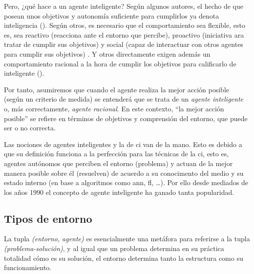 Pero, ¿qué hace a un agente inteligente? Según algunos autores, el hecho de que posean unos objetivos y autonomía suficiente para cumplirlos ya denota inteligencia (). Según otros, es necesario que el comportamiento sea flexible, esto es, sea reactivo (reacciona ante el entorno que percibe), proactivo (iniciativa ara tratar de cumplir sus objetivos) y social (capaz de interactuar con otros agentes para cumplir sus objetivos) . Y otros directamente exigen además un comportamiento racional a la hora de cumplir los objetivos para calificarlo de inteligente ().

Por tanto, asumiremos que cuando el agente realiza la mejor acción posible (según un criterio de medida) se entenderá que se trata de un \textit{agente inteligente} o, más correctamente, \textit{agente racional}. En este contexto, \enquote{la mejor acción posible} se refiere en términos de objetivos y comprensión del entorno, que puede ser o no correcta.

Las nociones de agentes inteligentes y la de \ac{ci} van de la mano. Esto es debido a que su definición funciona a la perfección para las técnicas de la \ac{ci}, esto es, agentes autónomos que perciben el entorno (problema) y actuan de la mejor manera posible sobre él (resuelven) de acuerdo a su conocimento del medio y su estado interno (en base a algoritmos como \ac{ann}, \ac{fl}, \ldots). Por ello desde mediados de los años 1990 el concepto de agente inteligente ha ganado tanta popularidad.

\subsection{Tipos de entorno}

La tupla \textit{(entorno, agente)} es esencialmente una metáfora para referirse a la tupla \textit{(problema-solución)}, y al igual que un problema determina en su práctica totalidad cómo es su solución, el entorno determina tanto la estructura como su funcionamiento.

